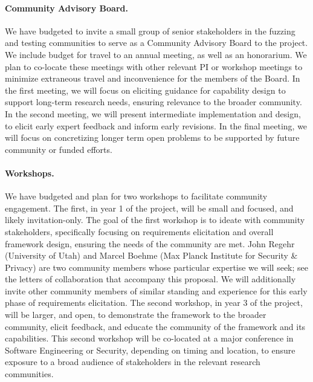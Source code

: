 \paragraph{Community Advisory Board.} We have budgeted to invite a small group
of senior stakeholders in the fuzzing and testing communities to serve as a
Community Advisory Board to the project.  We include budget for travel to an
annual meeting, as well as an honorarium. We plan to co-locate these meetings with
other relevant PI or workshop meetings to minimize extraneous travel and
inconvenience for the members of the Board.  In the first meeting, we will focus
on eliciting guidance for capability design to support long-term research needs,
ensuring relevance to the broader community.  In the second meeting, we will
present intermediate implementation and design, to elicit early expert feedback
and inform early revisions.  In the final meeting, we will focus on concretizing
longer term open problems to be supported by future community or funded efforts. 


\paragraph{Workshops.}  We have budgeted and plan for two workshops to
facilitate community engagement.  The first, in year 1 of the project, will be
small and focused, and likely invitation-only. The goal of the first workshop is
to ideate with community stakeholders, specifically focusing on requirements
elicitation and overall framework design, ensuring the needs of the community
are met.  John Regehr (University of Utah) and Marcel Boehme (Max Planck
Institute for Security \& Privacy) are two community members whose particular
expertise we will seek; see the letters of collaboration that accompany this
proposal.  We will additionally invite other community members of similar
standing and experience for this early phase of requirements elicitation.   The
second workshop, in year 3 of the project, will be larger, and open, to demonstrate the
framework to the broader community, elicit feedback, and educate the community
of the framework and its capabilities.  This second workshop will be co-located
at a major conference in Software Engineering or Security, depending on timing
and location, to ensure exposure to a broad audience of stakeholders in the
relevant research communities. 

